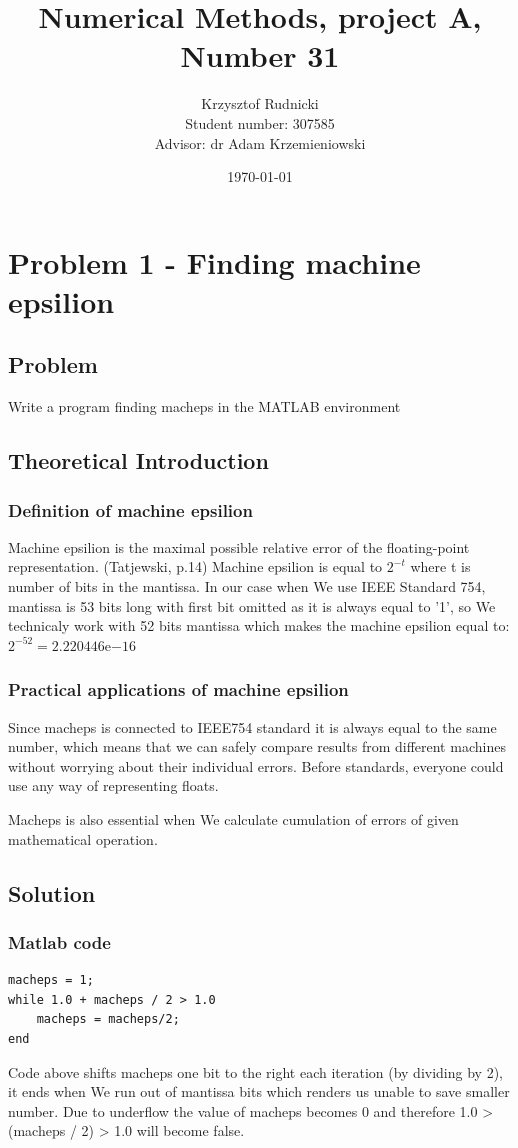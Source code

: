 \documentclass[12pt]{report}
\title{Numerical Methods, project A, Number 31}
\author{Krzysztof Rudnicki\\ Student number: 307585 \\ Advisor: dr Adam Krzemieniowski}
\date{\today}
\begin{document}
\maketitle
\tableofcontents

\chapter{Problem 1 - Finding machine epsilion}

\section{Problem}
Write a program finding macheps in the MATLAB environment
\section{Theoretical Introduction}
\subsection{Definition of machine epsilion}
Machine epsilion is the maximal possible relative error of the floating-point representation. (Tatjewski, p.14)
Machine epsilion is equal to $2^{-t}$ where t is number of bits in the mantissa.
In our case when We use IEEE Standard 754, mantissa is 53 bits long with first bit omitted as it is always equal to '1', so We technicaly work with 52 bits mantissa which makes the machine epsilion equal to: $2^{-52} = 2.220446\mathrm{e}{-16}$

\subsection{Practical applications of machine epsilion}
Since macheps is connected to IEEE754 standard it is always equal to the same number, which means that we can safely compare results from different machines without worrying about their individual errors. Before standards, everyone could use any way of representing floats.

Macheps is also essential when We calculate cumulation of errors of given mathematical operation.

\newpage
\section{Solution}

\subsection{Matlab code}
\begin{lstlisting}
macheps = 1;
while 1.0 + macheps / 2 > 1.0
    macheps = macheps/2;
end
\end{lstlisting}
Code above shifts macheps one bit to the right each iteration (by dividing by 2), it ends when We run out of mantissa bits which renders us unable to save smaller number. Due to underflow the value of macheps becomes 0 and therefore 1.0 > (macheps / 2) > 1.0 will become false.
\end{document}
